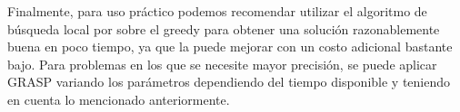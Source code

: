 Finalmente, para uso práctico podemos recomendar utilizar el algoritmo de búsqueda local por sobre el greedy para obtener
una solución razonablemente buena en poco tiempo, ya que la puede mejorar con un costo adicional bastante bajo. Para problemas
en los que se necesite mayor precisión, se puede aplicar GRASP variando los parámetros dependiendo del tiempo disponible y
teniendo en cuenta lo mencionado anteriormente.

